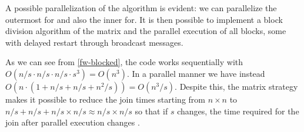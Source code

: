 
A possible parallelization of the algorithm is evident: we can parallelize the outermost for and also the inner for.
It is then possible to implement a block division algorithm of the matrix and the parallel execution of all blocks, some with delayed restart through broadcast messages.

As we can see from \cref{fw-blocked}, the code works sequentially with \(O(n/s \cdot n/s \cdot n/s \cdot s^3) =O(n^3) \).
In a parallel manner we have instead \(O(n \cdot (1+n/s+n/s+ n^2/s)) = O(n^3/s)\).
Despite this, the matrix strategy makes it possible to reduce the join times starting from \(n\times n\) to \(n/s + n/s + n/s \times n/s \approx n/s \times n/s\) so that if \(s\) changes, the time required for the join after parallel execution changes \cite{rucci}.

\FloatBarrier
